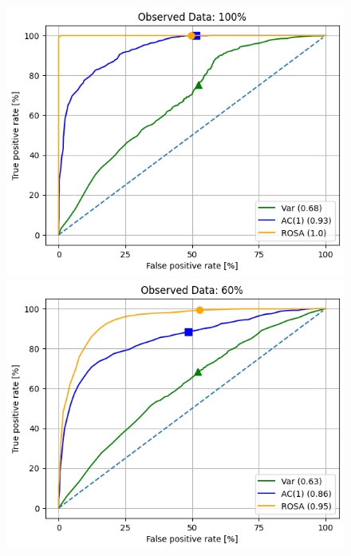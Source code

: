 \documentclass[%
thesis=student,%
coverpage=false,%
titlepage=false,%
headmarks=true, %
english,%
font=libertine, %
math=newpxtx, %
BCOR=5mm,%
coverBCOR=11mm%
]{tumbook}
\begin{document}
\begin{figure}[h!]
    \centering
    \begin{minipage}[t]{0.45\textwidth}
        \centering
        \includegraphics[width=\textwidth]{bachelor-thesis/figures/ROC_curves_100.png}
    \end{minipage}
    \hfill
    \begin{minipage}[t]{0.45\textwidth}
        \centering
        \includegraphics[width=\textwidth]{bachelor-thesis/figures/ROC_curves_60.png}
    \end{minipage}
    \vspace{0.5cm}
    

\end{figure}
\end{document}
